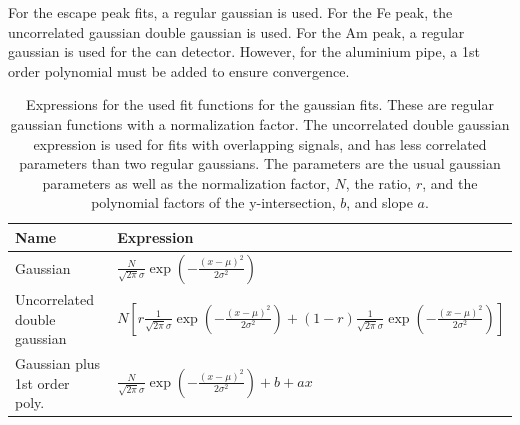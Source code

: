 For the escape peak fits, a regular gaussian is used. For the Fe peak, the uncorrelated gaussian double gaussian is used. For the Am peak, a regular gaussian is used for the can detector. However, for the aluminium pipe, a 1st order polynomial must be added to ensure convergence.

\begin{table}[htb!]
\begin{tabular}{ll}
\textbf{Name}                 & \textbf{Expression} \\ \hline
Gaussian                      & $\frac{N}{\sqrt{2\pi}\sigma}\exp{\left(-\frac{\left(x-\mu\right)^2}{2\sigma^2}\right)}$                    \\
Uncorrelated double gaussian  & $N\left[r\frac{1}{\sqrt{2\pi}\sigma}\exp{\left(-\frac{\left(x-\mu\right)^2}{2\sigma^2}\right)}+(1-r)\frac{1}{\sqrt{2\pi}\sigma}\exp{\left(-\frac{\left(x-\mu\right)^2}{2\sigma^2}\right)}\right]$                     \\
Gaussian plus 1st order poly. & $\frac{N}{\sqrt{2\pi}\sigma}\exp{\left(-\frac{\left(x-\mu\right)^2}{2\sigma^2}\right)} + b + ax$                   
\end{tabular}
\caption{Expressions for the used fit functions for the gaussian fits. These are regular gaussian functions with a normalization factor. The uncorrelated double gaussian expression is used for fits with overlapping signals, and has less correlated parameters than two regular gaussians. The parameters are the usual gaussian parameters as well as the normalization factor, $N$, the ratio, $r$, and the polynomial factors of the y-intersection, $b$, and slope $a$.}
\label{tab:fitfuncchannelfits}
\end{table}

